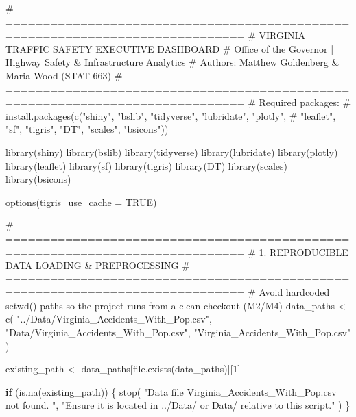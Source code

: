 \documentclass[
  letterpaper,
  DIV=11,
  numbers=noendperiod]{scrartcl}
\newenvironment{Shaded}{\begin{snugshade}}{\end{snugshade}}
\newcommand{\AttributeTok}[1]{\textcolor[rgb]{0.40,0.45,0.13}{#1}}
\newcommand{\CommentTok}[1]{\textcolor[rgb]{0.37,0.37,0.37}{#1}}
\newcommand{\ConstantTok}[1]{\textcolor[rgb]{0.56,0.35,0.01}{#1}}
\newcommand{\ControlFlowTok}[1]{\textcolor[rgb]{0.00,0.23,0.31}{\textbf{#1}}}
\newcommand{\DecValTok}[1]{\textcolor[rgb]{0.68,0.00,0.00}{#1}}
\newcommand{\FunctionTok}[1]{\textcolor[rgb]{0.28,0.35,0.67}{#1}}
\newcommand{\NormalTok}[1]{\textcolor[rgb]{0.00,0.23,0.31}{#1}}
\newcommand{\OtherTok}[1]{\textcolor[rgb]{0.00,0.23,0.31}{#1}}
\newcommand{\StringTok}[1]{\textcolor[rgb]{0.13,0.47,0.30}{#1}}
\begin{document}
\begin{Shaded}
\begin{Highlighting}[]
\CommentTok{\# ==============================================================================}
\CommentTok{\# VIRGINIA TRAFFIC SAFETY EXECUTIVE DASHBOARD}
\CommentTok{\# Office of the Governor | Highway Safety \& Infrastructure Analytics}
\CommentTok{\# Authors: Matthew Goldenberg \& Maria Wood (STAT 663)}
\CommentTok{\# ==============================================================================}
\CommentTok{\# Required packages:}
\CommentTok{\# install.packages(c("shiny", "bslib", "tidyverse", "lubridate", "plotly",}
\CommentTok{\#                    "leaflet", "sf", "tigris", "DT", "scales", "bsicons"))}

\FunctionTok{library}\NormalTok{(shiny)}
\FunctionTok{library}\NormalTok{(bslib)}
\FunctionTok{library}\NormalTok{(tidyverse)}
\FunctionTok{library}\NormalTok{(lubridate)}
\FunctionTok{library}\NormalTok{(plotly)}
\FunctionTok{library}\NormalTok{(leaflet)}
\FunctionTok{library}\NormalTok{(sf)}
\FunctionTok{library}\NormalTok{(tigris)}
\FunctionTok{library}\NormalTok{(DT)}
\FunctionTok{library}\NormalTok{(scales)}
\FunctionTok{library}\NormalTok{(bsicons)}

\FunctionTok{options}\NormalTok{(}\AttributeTok{tigris\_use\_cache =} \ConstantTok{TRUE}\NormalTok{)}

\CommentTok{\# ==============================================================================}
\CommentTok{\# 1. REPRODUCIBLE DATA LOADING \& PREPROCESSING}
\CommentTok{\# ==============================================================================}
\CommentTok{\# Avoid hardcoded setwd() paths so the project runs from a clean checkout (M2/M4)}
\NormalTok{data\_paths }\OtherTok{\textless{}{-}} \FunctionTok{c}\NormalTok{(}
  \StringTok{"../Data/Virginia\_Accidents\_With\_Pop.csv"}\NormalTok{,}
  \StringTok{"Data/Virginia\_Accidents\_With\_Pop.csv"}\NormalTok{,}
  \StringTok{"Virginia\_Accidents\_With\_Pop.csv"}
\NormalTok{)}

\NormalTok{existing\_path }\OtherTok{\textless{}{-}}\NormalTok{ data\_paths[}\FunctionTok{file.exists}\NormalTok{(data\_paths)][}\DecValTok{1}\NormalTok{]}

\ControlFlowTok{if}\NormalTok{ (}\FunctionTok{is.na}\NormalTok{(existing\_path)) \{}
  \FunctionTok{stop}\NormalTok{(}
    \StringTok{"Data file \textquotesingle{}Virginia\_Accidents\_With\_Pop.csv\textquotesingle{} not found. "}\NormalTok{,}
    \StringTok{"Ensure it is located in \textquotesingle{}../Data/\textquotesingle{} or \textquotesingle{}Data/\textquotesingle{} relative to this script."}
\NormalTok{  )}
\NormalTok{\}}


\end{Highlighting}
\end{Shaded}
\end{document}
